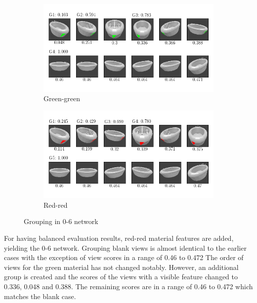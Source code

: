 \begin{figure}
	\centering
	\begin{subfigure}{\textwidth}
		\includegraphics[trim=10 20 10 20, clip]{images/mn-sl-0-6-20/bathtub_0107_4_grouping.png}
		\caption{Green-green}
		\label{fig:grouping-0-6-green-green}
	\end{subfigure}
	\begin{subfigure}{\textwidth}
		\includegraphics[trim=10 20 10 20, clip]{images/mn-sl-0-6-20/bathtub_0107_5_grouping.png}
		\caption{Red-red}
		\label{fig:grouping-0-6-red-red}
	\end{subfigure}
	\caption[Grouping in 0-6 network]{Grouping in 0-6 network}
	\label{fig:grouping-0-6}
\end{figure}
For having balanced evaluation results, red-red material features are added, yielding the 0-6 network.
Grouping blank views is almost identical to the earlier cases with the exception of view scores in a range of 0.46 to 0.472
The order of views for the green material has not changed notably.
However, an additional group is created and the scores of the views with a visible feature changed to 0.336, 0.048 and 0.388.
The remaining scores are in a range of 0.46 to 0.472 which matches the blank case.
